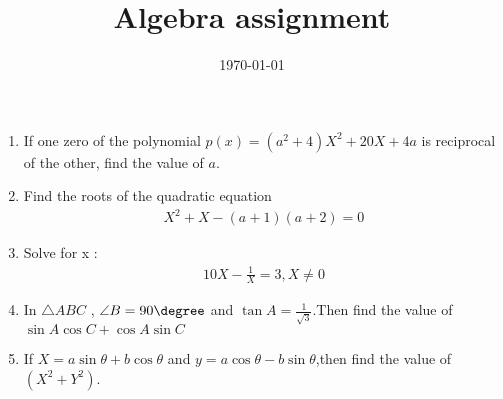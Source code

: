 \documentclass[20pt,-letter paper]{article}
\title{Algebra assignment}
\date{\today}
\begin{document}


\begin{enumerate}

\item If one zero of the polynomial $p(x) = (a^2+4)X^2+20X+4a$ is reciprocal of the other, find the value of $a$.

\item Find the roots of the quadratic equation
\begin{align}
 X^2+X-(a+1)(a+2)=0
\end{align}

\item  Solve for x :
\begin{align}
 10X-\frac{1}{X} = 3, X \ne {0}
\end{align}
\item In $\triangle ABC $ , $\angle B = 90\degree$ and $ \tan A = \frac{1}{\sqrt{3}}$.Then find the value of $\sin A \cos C + \cos A\sin C $



\item If $ X = a\sin\theta +b\cos\theta$ and $ y = a\cos\theta - b\sin\theta$,then find the value of $(X^2+Y^2)$.


\end{enumerate}
\end{document}

